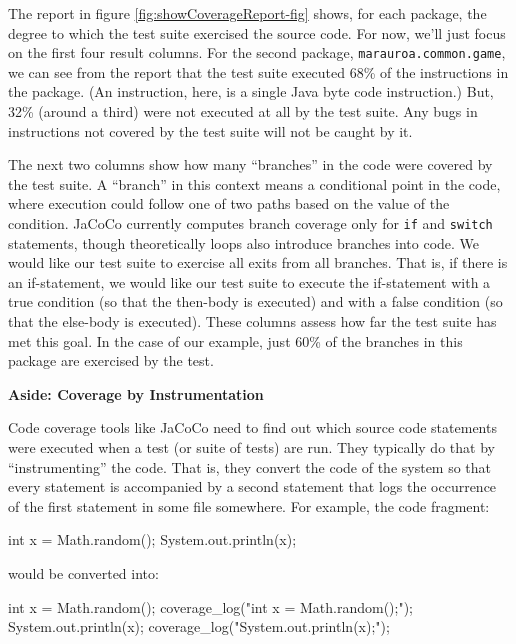 \documentclass[
]{book}
\newenvironment{Shaded}{\begin{snugshade}}{\end{snugshade}}
\newcommand{\BuiltInTok}[1]{#1}
\newcommand{\DataTypeTok}[1]{\textcolor[rgb]{0.13,0.29,0.53}{#1}}
\newcommand{\FunctionTok}[1]{\textcolor[rgb]{0.00,0.00,0.00}{#1}}
\newcommand{\NormalTok}[1]{#1}
\newcommand{\StringTok}[1]{\textcolor[rgb]{0.31,0.60,0.02}{#1}}
\begin{document}
The report in figure \ref{fig:showCoverageReport-fig} shows, for each package, the degree to which the test suite exercised the source code. For now, we'll just focus on the first four result columns. For the second package, \texttt{marauroa.common.game}, we can see from the report that the test suite executed 68\% of the instructions in the package. (An instruction, here, is a single Java byte code instruction.) But, 32\% (around a third) were not executed at all by the test suite. Any bugs in instructions not covered by the test suite will not be caught by it.

The next two columns show how many ``branches'' in the code were covered by the test suite. A ``branch'' in this context means a conditional point in the code, where execution could follow one of two paths based on the value of the condition. JaCoCo currently computes branch coverage only for \texttt{if} and \texttt{switch} statements, though theoretically loops also introduce branches into code. We would like our test suite to exercise all exits from all branches. That is, if there is an if-statement, we would like our test suite to execute the if-statement with a true condition (so that the then-body is executed) and with a false condition (so that the else-body is executed). These columns assess how far the test suite has met this goal. In the case of our example, just 60\% of the branches in this package are exercised by the test.

\textbf{Aside: Coverage by Instrumentation}

Code coverage tools like JaCoCo need to find out which source code statements were executed when a test (or suite of tests) are run. They typically do that by ``instrumenting'' the code. That is, they convert the code of the system so that every statement is accompanied by a second statement that logs the occurrence of the first statement in some file somewhere. For example, the code fragment:

\begin{Shaded}
\begin{Highlighting}[]
\DataTypeTok{int}\NormalTok{ x = }\BuiltInTok{Math}\NormalTok{.}\FunctionTok{random}\NormalTok{();}
\BuiltInTok{System}\NormalTok{.}\FunctionTok{out}\NormalTok{.}\FunctionTok{println}\NormalTok{(x);}
\end{Highlighting}
\end{Shaded}

would be converted into:

\begin{Shaded}
\begin{Highlighting}[]
\DataTypeTok{int}\NormalTok{ x = }\BuiltInTok{Math}\NormalTok{.}\FunctionTok{random}\NormalTok{();}
\FunctionTok{coverage\_log}\NormalTok{(}\StringTok{"int x = Math.random();"}\NormalTok{);}
\BuiltInTok{System}\NormalTok{.}\FunctionTok{out}\NormalTok{.}\FunctionTok{println}\NormalTok{(x);}
\FunctionTok{coverage\_log}\NormalTok{(}\StringTok{"System.out.println(x);"}\NormalTok{);}
\end{Highlighting}
\end{Shaded}
\end{document}
